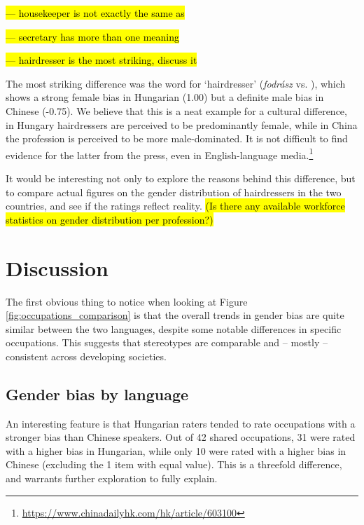 \documentclass[11pt]{article}
\newcommand{\zh}[1]{\simplifiedchinesefont{#1}\rmfamily}
\begin{document}
\hl{--- housekeeper is not exactly the same as} \zh{家政员}

\hl{--- secretary has more than one meaning}

\hl{--- hairdresser is the most striking, discuss it}

The most striking difference was the word for `hairdresser' (\textit{fodrász} vs. \zh{理发师}), which shows a strong female bias in Hungarian (1.00) but a definite male bias in Chinese (-0.75). We believe that this is a neat example for a cultural difference, in Hungary hairdressers are perceived to be predominantly female, while in China the profession is perceived to be more male-dominated. It is not difficult to find evidence for the latter from the press, even in English-language media.\footnote{\href{https://www.chinadailyhk.com/hk/article/603100}{https://www.chinadailyhk.com/hk/article/603100}}

It would be interesting not only to explore the reasons behind this difference, but to compare actual figures on the gender distribution of hairdressers in the two countries, and see if the ratings reflect reality. \hl{(Is there any available workforce statistics on gender distribution per profession?)}



\section{Discussion}\label{sec:discussion}


The first obvious thing to notice when looking at Figure \ref{fig:occupations_comparison} is that the overall trends in gender bias are quite similar between the two languages, despite some notable differences in specific occupations. This suggests that stereotypes are comparable and -- mostly -- consistent across developing societies.

\subsection{Gender bias by language}

An interesting feature is that Hungarian raters tended to rate occupations with a stronger bias than Chinese speakers. Out of 42 shared occupations, 31 were rated with a higher bias in Hungarian, while only 10 were rated with a higher bias in Chinese (excluding the 1 item with equal value). This is a threefold difference, and warrants further exploration to fully explain.
\end{document}
